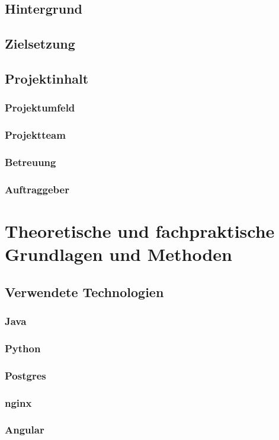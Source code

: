 \documentclass[pdftex,11pt,a4paper,oneside]{book}
\begin{document}
\section{Hintergrund}
\section{Zielsetzung}
\section{Projektinhalt}
\subsection{Projektumfeld}
\subsection{Projektteam}
\subsection{Betreuung}
\subsection{Auftraggeber}

\chapter{Theoretische und fachpraktische Grundlagen und Methoden}
\section{Verwendete Technologien}
\subsection{Java}
\subsection{Python}
\subsection{Postgres}
\subsection{nginx}
\subsection{Angular}
\end{document}
